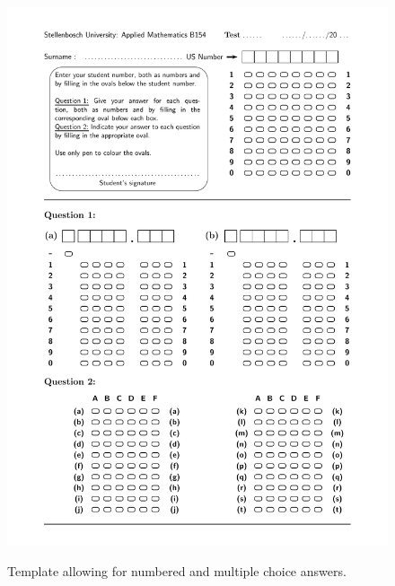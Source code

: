 \begin{figure}
  \centering
  \includegraphics[width=12cm]{template2}\\
  \caption{Template allowing for numbered and multiple choice answers.}
  \label{fig:template2}
\end{figure}

